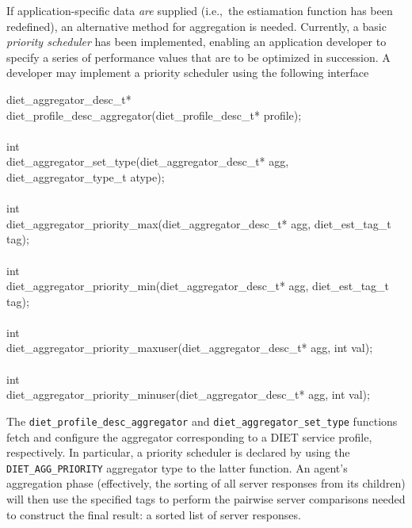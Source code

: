 If application-specific data \emph{are} supplied (i.e.,~the
estiamation function has been redefined), an alternative method for
aggregation is needed.  Currently, a basic
\emph{priority scheduler} has been implemented, enabling an
application developer to specify a series of performance values that
are to be optimized in succession.  A developer may implement a
priority scheduler using the following interface
\begin{code}
diet\_aggregator\_desc\_t* \\
diet\_profile\_desc\_aggregator(diet\_profile\_desc\_t* profile); \\
\\
int \\
diet\_aggregator\_set\_type(diet\_aggregator\_desc\_t* agg, diet\_aggregator\_type\_t atype); \\
\\
int \\
diet\_aggregator\_priority\_max(diet\_aggregator\_desc\_t* agg, diet\_est\_tag\_t tag); \\
\\
int \\
diet\_aggregator\_priority\_min(diet\_aggregator\_desc\_t* agg, diet\_est\_tag\_t tag); \\
\\
int \\
diet\_aggregator\_priority\_maxuser(diet\_aggregator\_desc\_t* agg, int val); \\
\\
int \\
diet\_aggregator\_priority\_minuser(diet\_aggregator\_desc\_t* agg, int val); \\
\end{code}
The \texttt{diet\_profile\_desc\_aggregator} and
\texttt{diet\_aggregator\_set\_type} functions fetch and configure the
aggregator corresponding to a DIET service profile, respectively.
In particular, a priority scheduler is declared by using the
\texttt{DIET\_AGG\_PRIORITY} aggregator type to the latter function.
An agent's aggregation phase (effectively, the sorting of all server
responses from its children) will then use the specified tags to
perform the pairwise server comparisons needed to construct the final
result: a sorted list of server responses.

